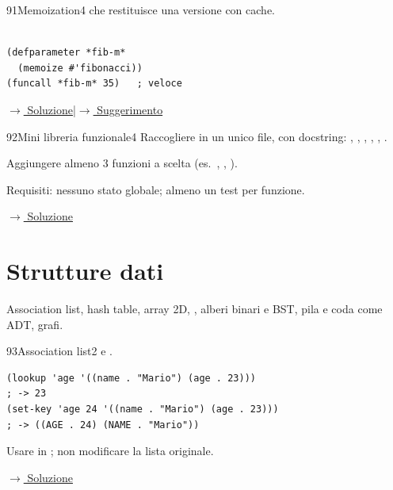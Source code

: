\label{ex:91}
\begin{stdbox}{91}{Memoization}{4}
  che restituisce una versione
con cache.\\\\
\begin{lstlisting}
(defparameter *fib-m*
  (memoize #'fibonacci))
(funcall *fib-m* 35)   ; veloce
\end{lstlisting}

\small\color{black!55}\hyperref[sol:91]{$\rightarrow$ Soluzione}\enspace\textcolor{black!30}{|}\enspace\hyperref[hint:91]{$\rightarrow$ Suggerimento}\normalsize\color{black}
\end{stdbox}

\label{ex:92}
\begin{colbox}{92}{Mini libreria funzionale}{4}
Raccogliere in un unico file, con docstring:
, , ,
, , .

Aggiungere almeno 3 funzioni a scelta (es.\ , , ).

Requisiti: nessuno stato globale; almeno un test per funzione.


\small\color{black!55}\hyperref[sol:92]{$\rightarrow$ Soluzione}\normalsize\color{black}
\end{colbox}

\setcounter{section}{4}
\section{Strutture dati}

\noindent
Association list, hash table, array 2D, ,
alberi binari e BST, pila e coda come ADT, grafi.

\bigskip

\label{ex:93}
\begin{essbox}{93}{Association list}{2}
  e .
\nopagebreak
\begin{lstlisting}
(lookup 'age '((name . "Mario") (age . 23)))
; -> 23
(set-key 'age 24 '((name . "Mario") (age . 23)))
; -> ((AGE . 24) (NAME . "Mario"))
\end{lstlisting}
Usare  in ; non modificare la lista originale.


\small\color{black!55}\hyperref[sol:93]{$\rightarrow$ Soluzione}\normalsize\color{black}
\end{essbox}

